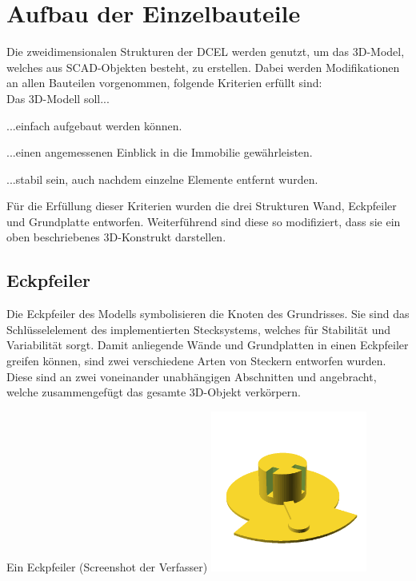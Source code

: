 \section{Aufbau der Einzelbauteile}
Die zweidimensionalen Strukturen der DCEL werden genutzt, um das 3D-Model, welches aus SCAD-Objekten besteht, zu erstellen.
Dabei werden Modifikationen an allen Bauteilen vorgenommen, folgende Kriterien erfüllt sind:\\
Das 3D-Modell soll...
\begin{compactenum}
	\item ...einfach aufgebaut werden können.
	\item ...einen angemessenen Einblick in die Immobilie gewährleisten.
	\item ...stabil sein, auch nachdem einzelne Elemente entfernt wurden.
\end{compactenum}
Für die Erfüllung dieser Kriterien wurden die drei Strukturen Wand, Eckpfeiler und Grundplatte entworfen.
Weiterführend sind diese so modifiziert, dass sie ein oben beschriebenes 3D-Konstrukt darstellen.

\subsection{Eckpfeiler}
Die Eckpfeiler des Modells symbolisieren die Knoten des Grundrisses.
Sie sind das Schlüsselelement des implementierten Stecksystems, welches für Stabilität und Variabilität sorgt.
Damit anliegende Wände und Grundplatten in einen Eckpfeiler greifen können, sind zwei verschiedene Arten von Steckern entworfen wurden.
Diese sind an zwei voneinander unabhängigen Abschnitten  und  angebracht, welche zusammengefügt das gesamte 3D-Objekt verkörpern.
\begin{Bild}{Ein Eckpfeiler (Screenshot der Verfasser)}
	\includegraphics[height=200px]{Bilder/Untereinheit_Ecke}
\end{Bild}
